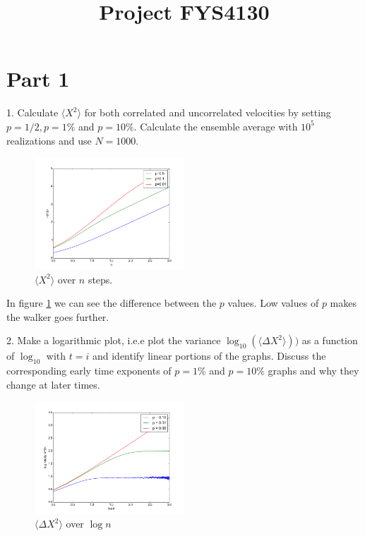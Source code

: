 \documentclass[twocolumn]{article}[10pt]
\title{Project FYS4130}
\begin{document}
\maketitle
{\center \section*{Part 1}}
{\color{black!70}
1. Calculate $\langle X^2\rangle$ for both correlated and uncorrelated velocities by setting $p=1/2, p=1\%$ and $p=10\%$. Calculate the ensemble average with $10^5$ realizations and use $N = 1000$.
}

\begin{figure}
\includegraphics[width=0.50\textwidth]{part1_1.png}
\caption{$\langle X^2\rangle$ over $n$ steps. }
\label{fig:1}
\end{figure}

In figure \ref{fig:1} we can see the difference between the $p$ values.
Low values of $p$ makes the walker goes further. 


{\color{black!70}2. Make a logarithmic plot, i.e.e plot the variance 
$\log_{10}(\langle\Delta X^2 \rangle))$ as a function of $\log_{10}$ 
with $t = i$ and identify linear portions of the graphs. Discuss the 
corresponding early time exponents of $p=1\%$ and $p=10\%$ graphs and
why they change at later times. 
}
\begin{figure}
\includegraphics[width=0.50\textwidth]{part1_2.png}
\caption{$\langle \Delta X^2\rangle$ over $\log n$ }
\label{fig:2}
\end{figure}
\end{document}
